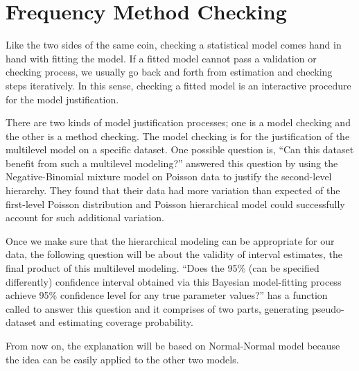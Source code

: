 \documentclass[article]{jss}
\begin{document}


\section[Frequency Method Checking]{Frequency Method Checking}
Like the two sides of the same coin, checking a statistical model comes hand in hand with fitting the model. If a fitted model cannot pass a validation or checking process, we usually go back and forth from estimation and checking steps iteratively. In this sense, checking a fitted model is an interactive procedure for the model justification.


There are two kinds of model justification processes; one is a model checking and the other is a method checking. The model checking is for the justification of the multilevel model on a specific dataset. One possible question is, ``Can this dataset benefit from such a multilevel modeling?'' \cite{1997} answered this question by using the Negative-Binomial mixture model on Poisson data to justify the second-level hierarchy. They found that their data had more variation than expected of the first-level Poisson distribution and Poisson hierarchical model could successfully account for such additional variation.


Once we make sure that the hierarchical modeling can be appropriate for our data, the following question will be about the validity of interval estimates, the final product of this multilevel modeling. ``Does the 95\% (can be specified differently) confidence interval obtained via this Bayesian model-fitting process achieve 95\% confidence level  for any true parameter values?''  has a function called  to answer this question and it comprises of two parts, generating pseudo-dataset and estimating coverage probability.

From now on, the explanation will be based on Normal-Normal model because the idea can be easily applied to the other two models.
\end{document}
